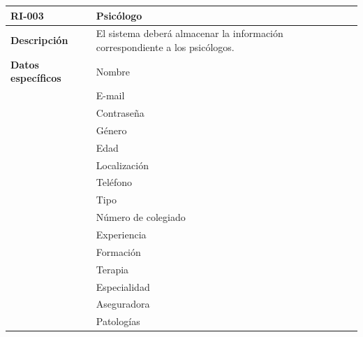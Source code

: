 \begin{table}[htpb]
\centering
\begin{tabularx}{\textwidth}{|l|X|}
\hline
\rowcolor[gray]{0.9}\textbf{RI-003}             & \textbf{Psicólogo}                                                                    \\ \hline
\textbf{Descripción}        & El sistema deberá almacenar la información correspondiente a los psicólogos. \\ \hline
\textbf{Datos específicos}  & Nombre                                                                       \\ \hline
\multirow{18}{*}{} & E-mail                                                                       \\ 
                   & Contraseña                                                                   \\  
                   & Género                                                                       \\ 
                   & Edad                                                                         \\  
                   & Localización                                                                 \\ 
                   & Teléfono                                                                     \\ 
                   & Tipo                                                                         \\ 
                   & Número de colegiado                                                                        \\  
                   & Experiencia                                                                  \\ 
                   & Formación                                                                    \\ 
                   & Terapia                                                                      \\ 
                   & Especialidad                                                                 \\ 
                   & Aseguradora                                                                  \\  
                   & Patologías                                                                   \\  

\end{tabularx}
\end{table}
